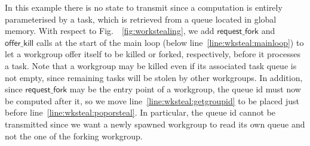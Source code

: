 \documentclass[sigconf]{acmart}
\newcommand{\myfig}{Fig.~}
\newcommand{\offerfork}{\mathsf{request\_fork}}
\newcommand{\offerkill}{\mathsf{offer\_kill}}
\begin{document}
{
%
In this example there is no state to transmit since a computation is
entirely parameterised by a task, which is retrieved from a queue
located in global memory. With respect to \myfig~\ref{fig:workstealing},
we add $\offerfork$ and $\offerkill$ calls at the start of the main loop
(below line~\ref{line:wksteal:mainloop}) to let a workgroup offer itself
to be killed or forked, respectively, before it processes a task.  Note
that a workgroup may be killed even if its associated task queue is not
empty, since remaining tasks will be stolen by other workgroups. In
addition, since $\offerfork$ may be the entry point of a workgroup, the
queue id must now be computed after it, so we move
line~\ref{line:wksteal:getgroupid} to be placed just before
line~\ref{line:wksteal:poporsteal}. In particular, the queue id cannot
be transmitted since we want a newly spawned workgroup to read its own
queue and not the one of the forking workgroup.


}
\end{document}
